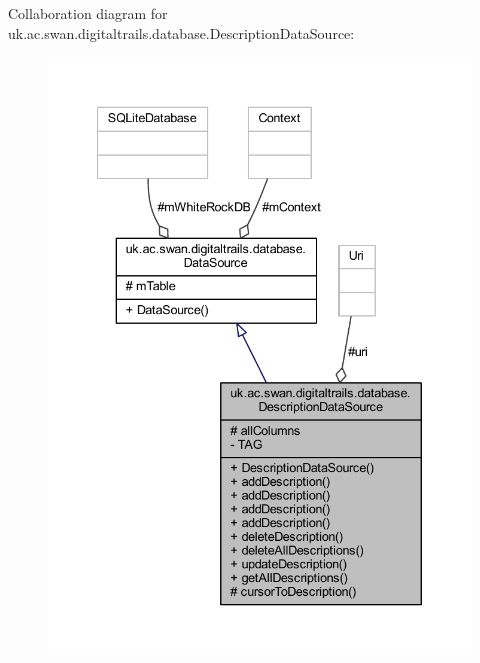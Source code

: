 Collaboration diagram for uk.\+ac.\+swan.\+digitaltrails.\+database.\+Description\+Data\+Source\+:
\nopagebreak
\begin{figure}[H]
\begin{center}
\leavevmode
\includegraphics[width=340pt]{classuk_1_1ac_1_1swan_1_1digitaltrails_1_1database_1_1_description_data_source__coll__graph}
\end{center}
\end{figure}
